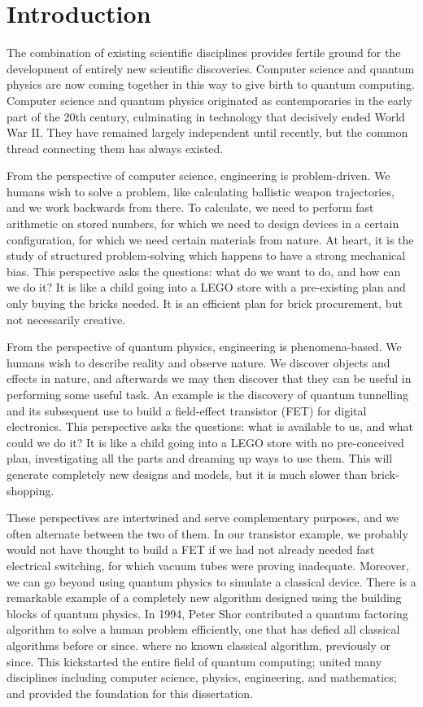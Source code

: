 \chapter{Introduction}
\label{chap:intro}

The combination of existing scientific disciplines provides fertile ground
for the development of entirely new scientific discoveries. Computer science
and quantum physics are now coming together in this way to give birth to
quantum computing. Computer science and quantum physics originated
as contemporaries in the early part of the 20th century, culminating in
technology that decisively ended World War II. They have remained
largely independent until recently, but the common thread connecting them
has always existed.

From the perspective of computer science, engineering is problem-driven.
We humans wish to solve a problem, like calculating ballistic weapon
trajectories, and we work backwards from there. To calculate,
we need to perform fast
arithmetic on stored numbers, for which we need to design devices in a
certain configuration, for which we need certain materials from nature.
At heart, it is the study of structured problem-solving which happens to have a strong
mechanical bias. This perspective asks the questions: what do we want to do,
and how can we
do it? It is like a child going into a LEGO store with a pre-existing plan
and only buying the bricks needed. It is an efficient plan for brick procurement,
but not
necessarily creative.

From the perspective of quantum physics, engineering is phenomena-based.
We humans wish to describe reality and observe nature. We discover objects
and effects in nature, and afterwards we may
then discover that they
can be useful in performing some useful task. An example is
the discovery of quantum tunnelling and its subsequent use to build a
field-effect transistor (FET) for digital electronics. This perspective asks the
questions: what is available to us, and what could we do it? It is like a child
going into a LEGO store with no pre-conceived plan, investigating all the
parts and dreaming up ways to use them. This will generate completely new
designs and models, but it is much slower than brick-shopping.

These perspectives are intertwined and serve complementary purposes,
and we often alternate
between the two of them. In our transistor example, we probably would not
have thought to build a FET if we had not already needed fast electrical
switching, for which vacuum tubes were proving inadequate. Moreover, we can
go beyond using quantum physics to simulate a classical device. There is
a remarkable example
of a completely new algorithm designed using the building blocks of
quantum physics. In 1994, Peter Shor contributed a quantum factoring algorithm
to solve a human problem efficiently,
one that has defied all classical algorithms before or since.
where no known classical algorithm, previously or since.
This kickstarted the entire field of quantum computing; united many
disciplines including computer science, physics, engineering, and
mathematics; and provided the foundation for this dissertation.

